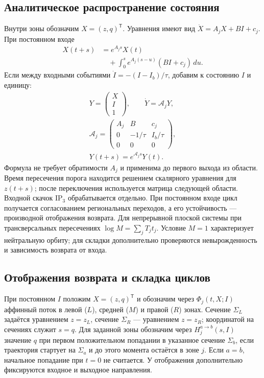 \subsection{Аналитическое распространение состояния}
Внутри зоны обозначим $X=(z,q)^\mathsf{T}$. Уравнения имеют вид $\dot X=A_jX+B I+c_j$. При постоянном входе
\begin{equation}
\begin{aligned}
X(t+s)&=e^{A_js}X(t)\\
 &\quad+\int_0^s e^{A_j(s-u)}(BI+c_j)\,du.
\end{aligned}
\end{equation}
Если между входными событиями $\dot I=-(I-I_b)/\tau$, добавим к состоянию $I$ и единицу:
\begin{equation}
\begin{gathered}
Y=\begin{pmatrix}X\\I\\1\end{pmatrix},\qquad
\dot Y=\mathcal A_jY,\\
\mathcal A_j=\begin{pmatrix}A_j&B&c_j\\0&-1/\tau&I_b/\tau\\0&0&0\end{pmatrix},\\
Y(t+s)=e^{\mathcal A_js}Y(t).
\end{gathered}
\end{equation}
Формула не требует обратимости $A_j$ и применима до первого выхода из области. Время пересечения порога находится решением скалярного уравнения для $z(t+s)$; после переключения используется матрица следующей области. Входной скачок IP$_3$ обрабатывается отдельно. При постоянном входе цикл получается согласованием региональных переходов, а его устойчивость --- производной отображения возврата. Для непрерывной плоской системы при трансверсальных пересечениях $\log M=\sum_jT_jt_j$. Условие $M=1$ характеризует нейтральную орбиту; для складки дополнительно проверяются невырожденность и зависимость возврата от входа.

\subsection{Отображения возврата и складка циклов}
При постоянном $I$ положим $X=(z,q)^\mathsf{T}$ и обозначим через $\Phi_j(t,X;I)$ аффинный поток в левой ($L$), средней ($M$) и правой ($R$) зонах. Сечение $\Sigma_L$ задаётся уравнением $z=z_L$, сечение $\Sigma_R$ --- уравнением $z=z_R$; координатой на сечениях служит $s=q$. Для заданной зоны обозначим через $H_j^{a\to b}(s,I)$ значение $q$ при первом положительном попадании в указанное сечение $\Sigma_b$, если траектория стартует на $\Sigma_a$ и до этого момента остаётся в зоне $j$. Если $a=b$, начальное попадание при $t=0$ не считается. У отображения дополнительно фиксируются входное и выходное направления.

